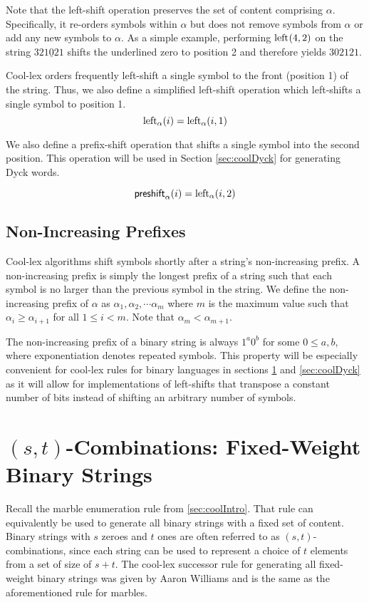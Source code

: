 Note that the left-shift operation preserves the set of content comprising $\alpha$.  Specifically, it re-orders symbols within $\alpha$ but does not remove symbols from $\alpha$ or add any new symbols to $\alpha$. 
As a simple example, performing $\lshiftindex{4}{2}$ on the string $321\underline{0}21$ shifts the underlined zero to position 2 and therefore yields $302121$.

Cool-lex orders frequently left-shift a single symbol to the front (position 1) of the string.  Thus, we also define a simplified left-shift operation which left-shifts a single symbol to position 1.  
\begin{equation} \label{eq:simpleleftdef}
\leftshift[\alpha]{i}=\lshiftindex[\alpha]{i}{1}
\end{equation}

We also define a prefix-shift operation that shifts a single symbol into the second position. This operation will be used in Section \ref{sec:coolDyck} for generating Dyck words.

\begin{equation} \label{eq:preshiftdef}
\preshift{\alpha}{i}=\lshiftindex[\alpha]{i}{2}
\end{equation}


\subsection{Non-Increasing Prefixes}
Cool-lex algorithms  shift symbols shortly after a string's non-increasing prefix.  A non-increasing prefix is simply the longest prefix of a string such that each symbol is no larger than the previous symbol in the string.  We define the non-increasing prefix of $\alpha$ as $\alpha_1,\alpha_2,\cdots\alpha_m$ where $m$ is 
the maximum value such that $\alpha_{i} \ge \alpha_{i+1}$ for all $1 \le i < m$. Note that $\alpha_m < \alpha_{m+1}$. 

The non-increasing prefix of a binary string is always $1^a0^b$ for some $0 \le a,b$, where exponentiation denotes repeated symbols.  This property will be especially convenient for cool-lex rules for binary languages in sections \ref{sec:coolCombo} and \ref{sec:coolDyck} as it will allow for implementations of left-shifts that transpose a constant number of bits instead of shifting an arbitrary number of symbols.

\section{$(s,t)$-Combinations: Fixed-Weight Binary Strings} \label{sec:coolCombo}
Recall the marble enumeration rule from \ref{sec:coolIntro}.  That rule can equivalently be used to generate all binary strings with a fixed set of content.  
Binary strings with $s$ zeroes and $t$ ones are often referred to as $(s,t)$-combinations, since each string can be used to represent a choice of $t$ elements from a set of size of $s+t$.  The cool-lex successor rule for generating all fixed-weight binary strings was given by Aaron Williams \cite{williams2009shift} and is the same as the aforementioned rule for marbles.

